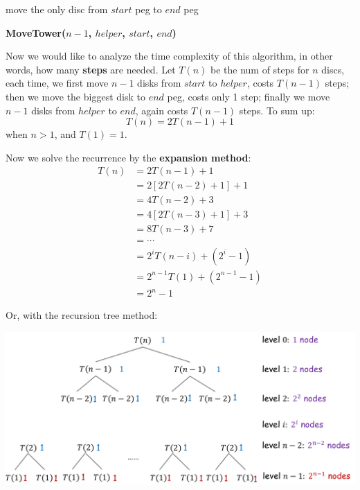 \documentclass[11pt, a4paper]{COMP3711}
\begin{document}
\begin{spacing}{1.5}
\begin{algorithm*}
{            move the only disc from $start$ peg to $end$ peg

            {}
            {}
            {\bf MoveTower($n-1$, $helper$, $start$, $end$)}
        }
    \end{algorithm*}

    Now we would like to analyze the time complexity of this algorithm,
    in other words, how many {\bf steps} are needed.
    Let $T(n)$ be the num of steps for $n$ discs, each time, 
    we first move $n-1$ disks from $start$ to $helper$, 
    costs $T(n-1)$ steps; then we move the biggest disk to $end$ peg,
    costs only 1 step; finally we move $n-1$ disks from $helper$
    to $end$, again costs $T(n-1)$ steps. To sum up:
    $$T(n)=2T(n-1)+1$$ when $n>1$, and $T(1)=1$.

    Now we solve the recurrence by the {\bf expansion method}:
    \begin{align*}
        T(n) &= 2T(n-1) + 1\\
             &= 2[2T(n-2)+1] + 1\\
             &= 4T(n-2)+3\\
             &= 4[2T(n-3)+1] + 3 \\
             &= 8T(n-3) + 7\\
             &= \cdots \\
             &= 2^i T(n-i) + (2^i-1)\\
             &= 2^{n-1} T(1) + (2^{n-1}-1)\\
             &= 2^n-1
    \end{align*}

    Or, with the recursion tree method:
    \begin{center}
        \includegraphics[scale=0.2]{images/02-hanoi-tree.jpeg}
    \end{center}
    

\end{spacing}
\end{document}
